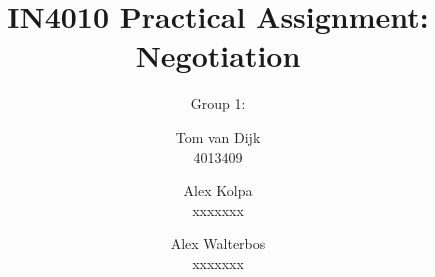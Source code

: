 \title{IN4010 Practical Assignment: Negotiation}
\author{Group 1: \and
Tom van Dijk \\ 4013409 \and
Alex Kolpa \\ xxxxxxx \and
Alex Walterbos \\ xxxxxxx}
\date{}